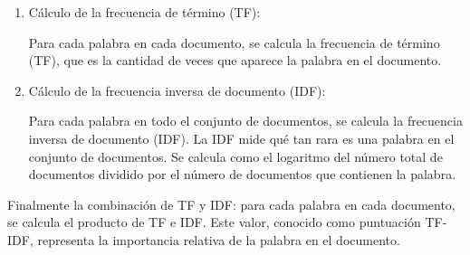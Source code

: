 \begin{enumerate}
    \item Cálculo de la frecuencia de término (TF):
    
    Para cada palabra en cada documento, se calcula la frecuencia de término (TF), que es 
    la cantidad de veces que aparece la palabra en el documento.

    \item Cálculo de la frecuencia inversa de documento (IDF):
    
    Para cada palabra en todo el conjunto de documentos, se calcula la frecuencia inversa 
    de documento (IDF). La IDF mide qué tan rara es una palabra en el conjunto de documentos. 
    Se calcula como el logaritmo del número total de documentos dividido por el número de 
    documentos que contienen la palabra.

\end{enumerate}


Finalmente la combinación de TF y IDF: para cada palabra en cada documento, se calcula el 
producto de TF e IDF. Este valor, conocido como puntuación TF-IDF, representa la importancia 
relativa de la palabra en el documento.